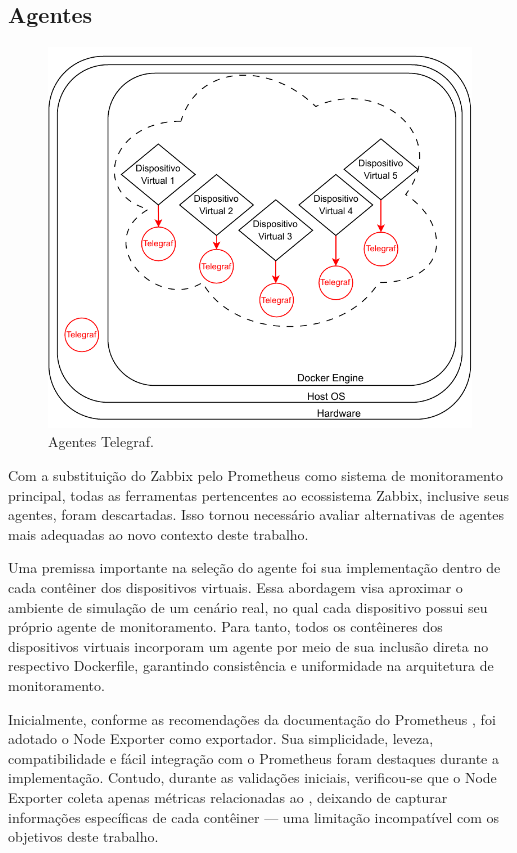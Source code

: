 \break

\subsection{Agentes}
\label{subsection:Agentes}

\begin{figure}[H]
\centering
\includegraphics[scale=1]{Imagens/chap03/by-blocks/agents_diagram.pdf}
\caption{Agentes Telegraf.}
\label{fig:DiagramaAgentes}
\end{figure}

Com a substituição do Zabbix pelo Prometheus como sistema de monitoramento principal, todas as ferramentas pertencentes ao ecossistema Zabbix, inclusive seus agentes, foram descartadas. Isso tornou necessário avaliar alternativas de agentes mais adequadas ao novo contexto deste trabalho.

Uma premissa importante na seleção do agente foi sua implementação dentro de cada contêiner dos dispositivos virtuais. Essa abordagem visa aproximar o ambiente de simulação de um cenário real, no qual cada dispositivo possui seu próprio agente de monitoramento. Para tanto, todos os contêineres dos dispositivos virtuais incorporam um agente por meio de sua inclusão direta no respectivo Dockerfile, garantindo consistência e uniformidade na arquitetura de monitoramento.

Inicialmente, conforme as recomendações da documentação do Prometheus \citep{promnodeexporter2025}, foi adotado o Node Exporter como exportador. Sua simplicidade, leveza, compatibilidade e fácil integração com o Prometheus foram destaques durante a implementação. Contudo, durante as validações iniciais, verificou-se que o Node Exporter coleta apenas métricas relacionadas ao , deixando de capturar informações específicas de cada contêiner --- uma limitação incompatível com os objetivos deste trabalho.

